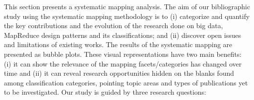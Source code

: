 
 
This section presents a systematic mapping analysis. The aim of our
bibliographic study using the systematic mapping methodology
\cite{Petersen:2008} is to (i) categorize and quantify the key contributions and
the evolution of the research done on big data, MapReduce design patterns and
its classifications; and (ii) discover open issues and limitations of existing works.
The results of the systematic mapping are presented as
bubble plots. These visual representations have two main
benefits: (i) it can show the relevance of the mapping facets/categories
has changed over time and (ii) it can reveal research opportunities
hidden on the blanks found among classification categories, pointing
topic areas and types of publications yet to be investigated. Our study is guided
by three research questions:



